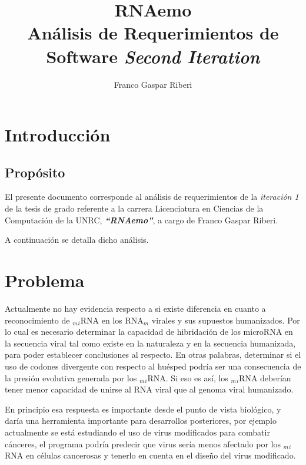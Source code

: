 \documentclass[12pt,a4paper,spanish]{article}
\title{\textbf
{RNAemo}\\ \vspace{0.45cm} Análisis de Requerimientos de Software \vskip 0.6cm \emph{Second Iteration}}
\author{Franco Gaspar Riberi}
\begin{document}
\maketitle\pagebreak{}\tableofcontents{}\pagebreak{}

\newpage


\section{Introducción}
\subsection{Propósito}
	\par El presente documento corresponde al análisis de requerimientos de la \emph{iteración 1} de la tesis de grado 		referente a la carrera Licenciatura en Ciencias de la Computación de la UNRC, \textit{\textbf{``RNAemo''}}, a cargo de 		Franco Gaspar Riberi.
	\par A continuación se detalla dicho análisis.

\section{Problema}
	\par Actualmente no hay evidencia respecto a si existe diferencia en cuanto a reconocimiento de $_m$$_i$RNA en los 		RNA$_m$	virales y sus supuestos humanizados. Por lo cual es necesario determinar la capacidad de hibridación de los 	microRNA en la secuencia viral tal como existe en la naturaleza y en la secuencia humanizada, para poder establecer 	conclusiones al respecto. En otras palabras, determinar si el uso de codones divergente con respecto al huésped podría 		ser una consecuencia de la presión evolutiva generada por los $_m$$_i$RNA. Si eso es así, los $_m$$_i$RNA deberían 		tener menor capacidad de unirse al RNA viral que al genoma viral humanizado. 

	\par En principio esa respuesta es importante desde el punto de vista biológico, y daría una herramienta importante 	para desarrollos posteriores, por ejemplo actualmente se está estudiando el uso de virus modificados para combatir 		cánceres, el programa podría predecir que virus sería menos afectado por los $_m$$_i$RNA en células cancerosas y 		tenerlo en cuenta en el diseño del virus modificado.
\end{document}
